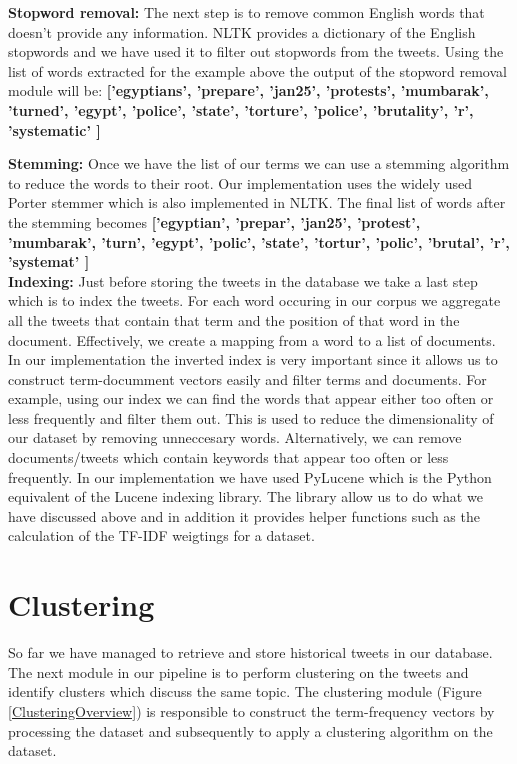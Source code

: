 \textbf{Stopword removal:} The next step is to remove common English words that doesn't provide any information. NLTK provides a dictionary of the English stopwords and we have used it to filter out stopwords from the tweets. Using the list of words extracted for the example above the output of the stopword removal module will be: \textbf{['egyptians', 'prepare', 'jan25', 'protests', 'mumbarak', 'turned', 'egypt', 'police', 'state', 'torture', 'police', 'brutality', 'r', 'systematic' ]}

\textbf{Stemming:} Once we have the list of our terms we can use a stemming algorithm to reduce the words to their root. Our implementation uses the widely used Porter stemmer which is also implemented in NLTK. The final list of words after the stemming becomes \textbf{['egyptian', 'prepar', 'jan25', 'protest', 'mumbarak', 'turn', 'egypt', 'polic', 'state', 'tortur', 'polic', 'brutal', 'r', 'systemat' ]}\\

\textbf{Indexing:} Just before storing the tweets in the database we take a last step which is to index the tweets. For each word occuring in our corpus we aggregate all the tweets that contain that term and the position of that word in the document. Effectively, we create a mapping from a word to a list of documents. In our implementation the inverted index is very important since it allows us to construct term-documment vectors easily and filter terms and documents. For example, using our index we can find the words that appear either too often or less frequently and filter them out. This is used to reduce the dimensionality of our dataset by removing unneccesary words. Alternatively, we
can remove documents/tweets which contain keywords that appear too often or less frequently. In our implementation we have used PyLucene which is the Python equivalent of the Lucene indexing library. The library allow us to do what we have discussed above and in addition it provides helper functions such as the calculation of the TF-IDF weigtings for a dataset.
 
\section{Clustering}

So far we have managed to retrieve and store historical tweets in our database. The next module in our pipeline is to perform clustering on the tweets and identify clusters which discuss the same topic. The clustering module (Figure \ref{ClusteringOverview}) is responsible to construct the term-frequency vectors by processing the dataset and subsequently to apply a clustering algorithm on the dataset. 

